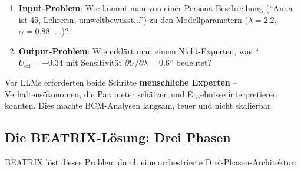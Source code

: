 \documentclass[12pt,a4paper]{article}
\begin{document}
\begin{enumerate}
    \item \textbf{Input-Problem}: Wie kommt man von einer Persona-Beschreibung (``Anna ist 45, Lehrerin, umweltbewusst...'') zu den Modellparametern ($\lambda = 2.2$, $\alpha = 0.88$, ...)?

    \item \textbf{Output-Problem}: Wie erklärt man einem Nicht-Experten, was ``$U_{\text{eff}} = -0.34$ mit Sensitivität $\partial U / \partial \lambda = 0.6$'' bedeutet?
\end{enumerate}

Vor LLMs erforderten beide Schritte \textbf{menschliche Experten} -- Verhaltensökonomen, die Parameter schätzen und Ergebnisse interpretieren konnten.
Dies machte BCM-Analysen langsam, teuer und nicht skalierbar.

\subsection{Die BEATRIX-Lösung: Drei Phasen}

BEATRIX löst dieses Problem durch eine orchestrierte Drei-Phasen-Architektur:
\end{document}
